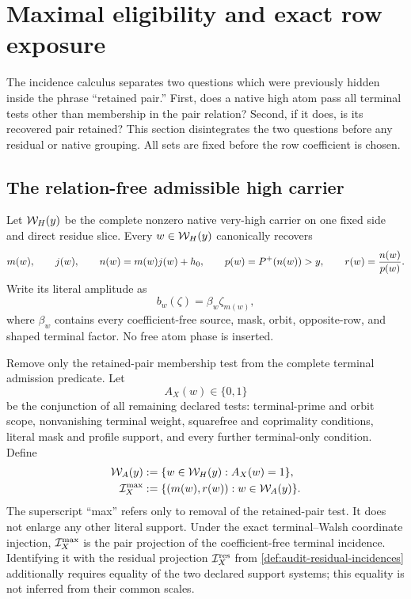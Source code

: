 \section{Maximal eligibility and exact row exposure}
\label{sec:exposure-factorization}

The incidence calculus separates two questions which were previously hidden
inside the phrase ``retained pair.''  First, does a native high atom pass all
terminal tests other than membership in the pair relation?  Second, if it
does, is its recovered pair retained?  This section disintegrates the two
questions before any residual or native grouping.  All sets are fixed before
the row coefficient is chosen.

\subsection{The relation-free admissible high carrier}

Let \(\mathcal W_H(y)\) be the complete nonzero native very-high carrier on one
fixed side and direct residue slice.  Every \(w\in\mathcal W_H(y)\) canonically
recovers
\begin{equation}
 m(w),\qquad j(w),\qquad
 n(w)=m(w)j(w)+h_0,\qquad
 p(w)=P^{+}(n(w))>y,\qquad
 r(w)=\frac{n(w)}{p(w)}.
 \label{eq:exposure-recovered-labels}
\end{equation}
Write its literal amplitude as
\begin{equation}
 b_w(\zeta)=\beta_w\zeta_{m(w)},
 \label{eq:exposure-literal-amplitude}
\end{equation}
where \(\beta_w\) contains every coefficient-free source, mask, orbit,
opposite-row, and shaped terminal factor.  No free atom phase is inserted.

Remove only the retained-pair membership test from the complete terminal
admission predicate.  Let
\begin{equation}
 A_X(w)\in\{0,1\}
 \label{eq:exposure-nonrelation-predicate}
\end{equation}
be the conjunction of all remaining declared tests: terminal-prime and
orbit scope, nonvanishing terminal weight, squarefree and coprimality
conditions, literal mask and profile support, and every further
terminal-only condition.  Define
\begin{align}
 \mathcal W_A(y)&:=\{w\in\mathcal W_H(y):A_X(w)=1\},
 \label{eq:exposure-admissible-high-carrier}\\
 \mathcal I_X^{\max}
 &:=\{(m(w),r(w)):w\in\mathcal W_A(y)\}.
 \label{eq:exposure-maximal-eligible-relation}
\end{align}
The superscript ``max'' refers only to removal of the retained-pair test.
It does not enlarge any other literal support.  Under the exact
terminal--Walsh coordinate injection, \(\mathcal I_X^{\max}\) is the pair
projection of the coefficient-free terminal incidence.  Identifying it
with the residual projection \(\mathcal I_X^{\rm res}\) from
\cref{def:audit-residual-incidences} additionally requires equality of the
two declared support systems; this equality is not inferred from their
common scales.

